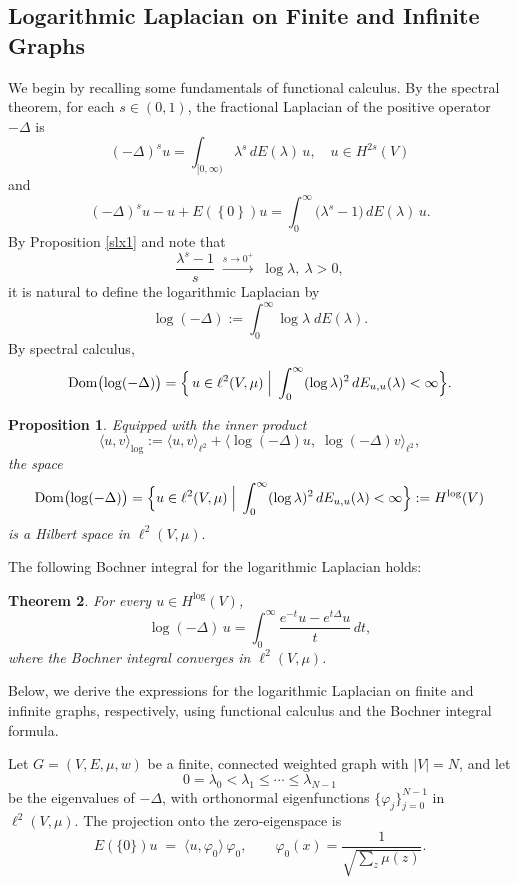 \documentclass[reqno,12pt]{amsart}
\numberwithin{equation}{section}
\newtheorem{theorem}{Theorem}[section]
\newtheorem{proposition}[theorem]{Proposition}
\begin{document}
\subsection{Logarithmic Laplacian on Finite and Infinite Graphs}
We begin by recalling some fundamentals of functional calculus. By the spectral theorem, for each \(s\in (0,1)\), the fractional Laplacian  of the positive  operator \(-\Delta\) is
\[
(-\Delta)^{s}u
=\int_{[0,\infty)}\lambda^{s}\,dE(\lambda)\,u,\quad u\in H^{2s}\left(V\right)
\]
and
\[
(-\Delta)^{s}u - u+E\left(\left\{0\right\}\right)u
=\int_{0}^{\infty}\bigl(\lambda^{s}-1\bigr)\,dE(\lambda)\,u.
\]
By Proposition \ref{slx1}
and note that
\[
\frac{\lambda^{s}-1}{s}
\;\xrightarrow{s\to0^+}\;\log \lambda,\:\lambda>0,
\]
it is natural to define the logarithmic Laplacian by
\begin{equation}\label{scja}
	\log(-\Delta)
	:=\int_{0}^{\infty}\log\lambda\;dE(\lambda).
\end{equation}
By spectral calculus,
\[
\operatorname{Dom}\bigl(\log(-\Delta)\bigr)=
\Bigl\{\,u\in\ell^{2}(V,\mu)\;\Big|\;
\int_{0}^{\infty}(\log\lambda)^{2}\,dE_{u,u}(\lambda)<\infty
\Bigr\}.
\]


\begin{proposition}\cite[Proposition 2.2]{chen2025logarithmic}\label{hlog}
	Equipped with the inner product
	\[
	\langle u,v\rangle_{\log}
	:=\langle u,v\rangle_{\ell^{2}}
	+\bigl\langle\log(-\Delta)u,\;\log(-\Delta)v\bigr\rangle_{\ell^{2}},
	\]
	the space
	\[
	\operatorname{Dom}\bigl(\log(-\Delta)\bigr)
	=\Bigl\{u\in\ell^{2}(V,\mu)\;\Big|\;\int_{0}^{\infty}(\log\lambda)^{2}\,dE_{u,u}(\lambda)<\infty\Bigr\}:=H^{\log}(V)
	\]
	is a Hilbert space in $\ell^2\left(V,\mu\right).$
\end{proposition}

The following Bochner integral  for the logarithmic Laplacian holds:


\begin{theorem}\cite[Theorem 2.12]{chen2025logarithmic}\label{bochlog}
	For every \(u\in H^{\log}(V)\),
	\[
	\log(-\Delta)\,u
	=\int_{0}^{\infty}\frac{e^{-t}u - e^{t\Delta}u}{t}\,dt,
	\]
	where the Bochner integral converges in \(\ell^2(V,\mu)\).
\end{theorem}

Below, we derive the expressions for the logarithmic Laplacian on finite and infinite graphs, respectively, using functional calculus and the Bochner integral formula.



Let \(G=(V,E,\mu,w)\) be a finite, connected weighted graph with \(|V|=N\), and let
\[
0=\lambda_{0}<\lambda_{1}\le\cdots\le\lambda_{N-1}
\]
be the eigenvalues of \(-\Delta\), with orthonormal eigenfunctions \(\{\varphi_{j}\}_{j=0}^{N-1}\) in \(\ell^2(V,\mu)\).  The projection onto the zero‐eigenspace is
\[
E(\{0\})u \;=\;\langle u,\varphi_{0}\rangle\,\varphi_{0},
\qquad \varphi_{0}(x)=\frac{1}{\sqrt{\sum_{z}\mu(z)}}.
\]
\end{document}
